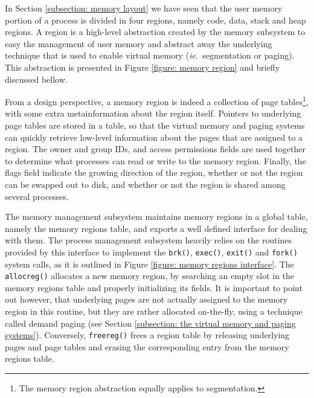 \documentclass[10pt,a4paper]{article}
\newcommand{\ie}{\textit{ie.\ }}
\begin{document}
In Section \ref{subsection: memory layout} we have seen that the user memory portion of a process is divided in four regions, namely code, data, stack and heap regions. A region is a high-level abstraction created by the memory subsystem to easy the management of user memory and abstract away the underlying technique that is used to enable virtual memory (\ie segmentation or paging). This abstraction is presented in Figure \ref{figure: memory region} and briefly discussed bellow.

From a design perspective, a memory region is indeed a collection of page tables\footnote{The memory region abstraction equally applies to segmentation.}, with some extra metainformation about the region itself. Pointers to underlying page tables are stored in a table, so that the virtual memory and paging systems can quickly retrieve low-level information about the pages that are assigned to a region. The owner and group IDs, and access permissions fields are used together to determine what processes can read or write to the memory region. Finally, the flags field indicate the growing direction of the region, whether or not the region can be swapped out to disk, and whether or not the region is shared among several processes.

The memory management subsystem maintains memory regions in a global table, namely the memory regions table, and exports a well defined interface for dealing with them. The process management subsystem heavily relies on the routines provided by this interface to implement the \texttt{brk()}, \texttt{exec()}, \texttt{exit()} and \texttt{fork()} system calls, as it is outlined in Figure \ref{figure: memory regions interface}. The \texttt{allocreg()} allocates a new memory region, by searching an empty slot in the memory regions table and properly initializing its fields. It is important to point out however, that underlying pages are not actually assigned to the memory region in this routine, but they are rather allocated on-the-fly, using a technique called demand paging (see Section \ref{subsection: the virtual memory and paging systems}). Conversely, \texttt{freereg()} frees a region table by releasing underlying pages and page tables and erasing the corresponding entry from the memory regions table.
\end{document}
